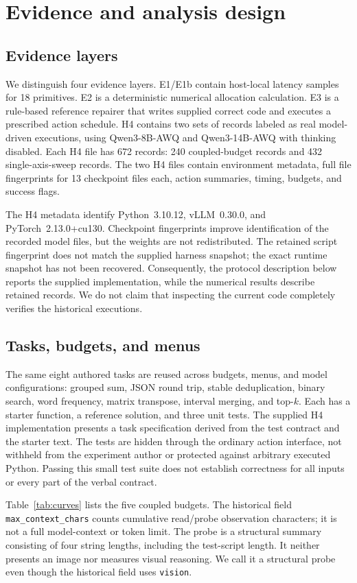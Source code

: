 \documentclass[11pt]{article}
\begin{document}
\section{Evidence and analysis design}
\subsection{Evidence layers}
We distinguish four evidence layers. E1/E1b contain host-local latency samples for 18 primitives. E2 is a deterministic numerical allocation calculation. E3 is a rule-based reference repairer that writes supplied correct code and executes a prescribed action schedule. H4 contains two sets of records labeled as real model-driven executions, using Qwen3-8B-AWQ and Qwen3-14B-AWQ with thinking disabled. Each H4 file has 672 records: 240 coupled-budget records and 432 single-axis-sweep records. The two H4 files contain environment metadata, full file fingerprints for 13 checkpoint files each, action summaries, timing, budgets, and success flags.

The H4 metadata identify Python~3.10.12, vLLM~0.30.0, and PyTorch~2.13.0+cu130. Checkpoint fingerprints improve identification of the recorded model files, but the weights are not redistributed. The retained script fingerprint does not match the supplied harness snapshot; the exact runtime snapshot has not been recovered. Consequently, the protocol description below reports the supplied implementation, while the numerical results describe retained records. We do not claim that inspecting the current code completely verifies the historical executions.

\subsection{Tasks, budgets, and menus}
The same eight authored tasks are reused across budgets, menus, and model configurations: grouped sum, JSON round trip, stable deduplication, binary search, word frequency, matrix transpose, interval merging, and top-$k$. Each has a starter function, a reference solution, and three unit tests. The supplied H4 implementation presents a task specification derived from the test contract and the starter text. The tests are hidden through the ordinary action interface, not withheld from the experiment author or protected against arbitrary executed Python. Passing this small test suite does not establish correctness for all inputs or every part of the verbal contract.

Table~\ref{tab:curves} lists the five coupled budgets. The historical field \texttt{max_context_chars} counts cumulative read/probe observation characters; it is not a full model-context or token limit. The probe is a structural summary consisting of four string lengths, including the test-script length. It neither presents an image nor measures visual reasoning. We call it a structural probe even though the historical field uses \texttt{vision}.
\end{document}
